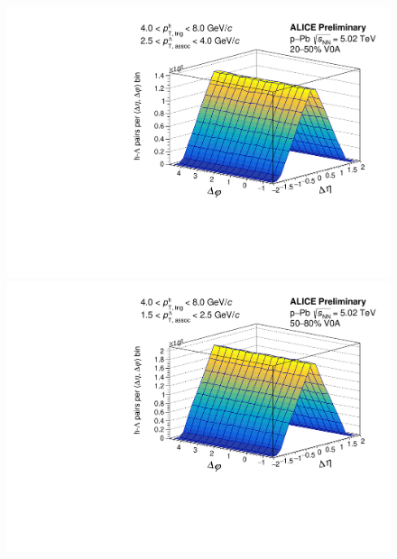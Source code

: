\begin{figure}[ht]
\begin{minipage}{0.48\textwidth}
	\end{minipage}
	\begin{minipage}{0.48\textwidth}
		\includegraphics[width=\textwidth]{figures/analysis/h_lambda_2d_mixed_fancy_label_20_50_highpt.pdf}
	\end{minipage}
	\begin{minipage}{0.48\textwidth}
		\includegraphics[width=\textwidth]{figures/analysis/h_lambda_2d_mixed_fancy_label_50_80_lowpt.pdf}
	\end{minipage}
	\begin{minipage}{0.48\textwidth}

\end{minipage}
\end{figure}
